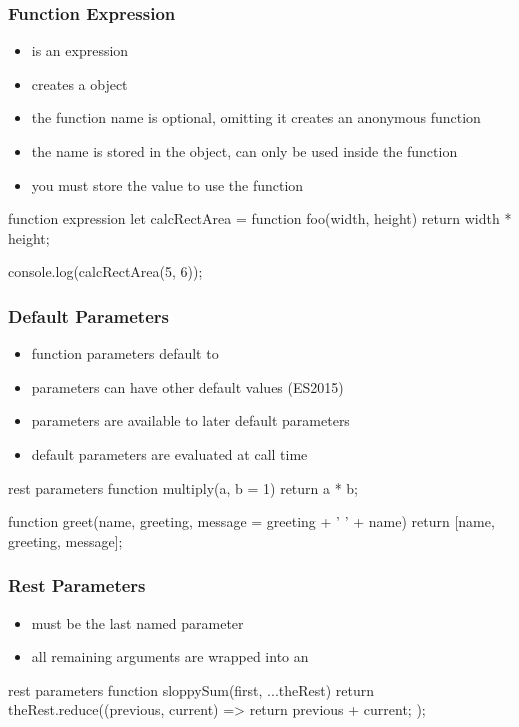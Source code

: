 \begin{frame}[fragile] \frametitle{Function Expression}

\begin{itemize}
  \item is an expression
  \item creates a  object
  \item the function name is optional, omitting it creates an anonymous function
  \item the name is stored in the  object, can only be used inside the function
  \item you must store the value to use the function
\end{itemize}
\begin{CodeBox}{function expression}
let calcRectArea = function foo(width, height) {
  return width * height;
}

console.log(calcRectArea(5, 6));
\end{CodeBox}
\end{frame}

\begin{frame}[fragile] \frametitle{Default Parameters}
\begin{itemize}
  \item function parameters default to 
  \item parameters can have other default values (ES2015)
  \item parameters are available to later default parameters
  \item default parameters are evaluated at call time
\end{itemize}

\begin{CodeBox}{rest parameters}
function multiply(a, b = 1) {
  return a * b;
}

function greet(name, 
                    greeting,
                    message = greeting + ' ' + name) {
    return [name, greeting, message];
}
\end{CodeBox}
\end{frame}

\begin{frame}[fragile] \frametitle{Rest Parameters}
\begin{itemize}
  \item must be the last named parameter
  \item all remaining arguments are wrapped into an 
\end{itemize}
\vspace{5mm}

\begin{CodeBox}{rest parameters}
function sloppySum(first, ...theRest) {
  return theRest.reduce((previous, current) => {
    return previous + current;
  });
}
\end{CodeBox}
\end{frame}


